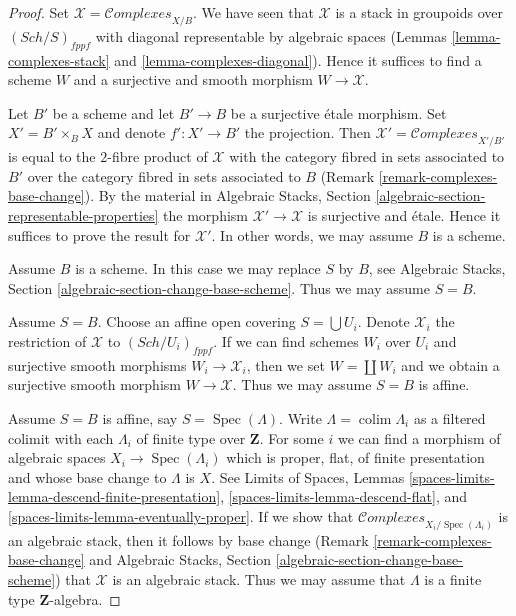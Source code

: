 \documentclass{stacks-project}
\theoremstyle{plain}
\theoremstyle{definition}
\theoremstyle{remark}
\numberwithin{equation}{subsection}
\def\colim{\mathop{\mathrm{colim}}\nolimits}
\def\Spec{\mathop{\mathrm{Spec}}}
\def\Sch{\mathit{Sch}}
\def\Complexesstack{\mathcal{C}\!\mathit{omplexes}}
\begin{document}
\begin{proof}
Set $\mathcal{X} = \Complexesstack_{X/B}$. We have seen that $\mathcal{X}$
is a stack in groupoids over $(\Sch/S)_{fppf}$ with diagonal representable
by algebraic spaces
(Lemmas \ref{lemma-complexes-stack} and \ref{lemma-complexes-diagonal}).
Hence it suffices to find a scheme $W$ and a surjective and smooth
morphism $W \to \mathcal{X}$.

\medskip\noindent
Let $B'$ be a scheme and let $B' \to B$ be a surjective \'etale morphism.
Set $X' = B' \times_B X$ and denote $f' : X' \to B'$ the projection.
Then $\mathcal{X}' = \Complexesstack_{X'/B'}$ is equal to the $2$-fibre
product of $\mathcal{X}$ with the category fibred in sets
associated to $B'$ over the category fibred in sets associated to $B$
(Remark \ref{remark-complexes-base-change}). By the material in
Algebraic Stacks, Section \ref{algebraic-section-representable-properties}
the morphism $\mathcal{X}' \to \mathcal{X}$ is surjective and \'etale.
Hence it suffices to prove the result for $\mathcal{X}'$.
In other words, we may assume $B$ is a scheme.

\medskip\noindent
Assume $B$ is a scheme. In this case we may replace $S$ by $B$, see
Algebraic Stacks, Section \ref{algebraic-section-change-base-scheme}.
Thus we may assume $S = B$.

\medskip\noindent
Assume $S = B$. Choose an affine open covering $S = \bigcup U_i$.
Denote $\mathcal{X}_i$ the restriction of $\mathcal{X}$ to
$(\Sch/U_i)_{fppf}$. If we can find schemes $W_i$ over $U_i$ and
surjective smooth morphisms $W_i \to \mathcal{X}_i$, then we
set $W = \coprod W_i$ and we obtain a surjective smooth morphism
$W \to \mathcal{X}$. Thus we may assume $S = B$ is affine.

\medskip\noindent
Assume $S = B$ is affine, say $S = \Spec(\Lambda)$.
Write $\Lambda = \colim \Lambda_i$ as a filtered colimit with each $\Lambda_i$
of finite type over $\mathbf{Z}$. For some $i$ we can find
a morphism of algebraic spaces $X_i \to \Spec(\Lambda_i)$
which is proper, flat, of finite presentation and whose base change
to $\Lambda$ is $X$. See Limits of Spaces, Lemmas
\ref{spaces-limits-lemma-descend-finite-presentation},
\ref{spaces-limits-lemma-descend-flat}, and
\ref{spaces-limits-lemma-eventually-proper}.
If we show that $\Complexesstack_{X_i/\Spec(\Lambda_i)}$ is an
algebraic stack, then it follows by base change
(Remark \ref{remark-complexes-base-change} and
Algebraic Stacks, Section \ref{algebraic-section-change-base-scheme})
that $\mathcal{X}$ is an algebraic stack.
Thus we may assume that $\Lambda$ is a finite type $\mathbf{Z}$-algebra.


\end{proof}
\end{document}
